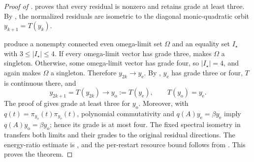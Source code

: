 \documentclass[11pt]{article}
\begin{document}
\begin{proof}[Proof of ]
 proves that every residual is nonzero and retains
grade at least three.  By
, the normalized
residuals are isometric to the diagonal monic-quadratic orbit
\(y_{k+1}=T(y_k)\).

 produce a nonempty connected even omega-limit set
\(\Omega\) and an equality set \(I_\star\) with
\(3\leq\lvert I_\star\rvert\leq4\).  If every omega-limit vector has grade
three,  makes \(\Omega\) a singleton.
Otherwise, some omega-limit vector has grade four, so
\(\lvert I_\star\rvert=4\), and
 again makes \(\Omega\) a singleton.
Therefore \(y_{2k}\to y_{\mathrm e}\).  By
, \(y_{\mathrm e}\) has grade three or four,
\(T\) is continuous there, and
\[
 y_{2k+1}=T(y_{2k})\longrightarrow
 y_{\mathrm o}:=T(y_{\mathrm e}),\qquad
 T(y_{\mathrm o})=y_{\mathrm e}.
\]
The proof of  gives grade at least three for
\(y_{\mathrm o}\).  Moreover, with
\(q(t)=\pi_{y_{\mathrm o}}(t)\pi_{y_{\mathrm e}}(t)\), polynomial
commutativity and \(q(A)y_{\mathrm e}=\beta y_{\mathrm e}\) imply
\(q(A)y_{\mathrm o}=\beta y_{\mathrm o}\); hence its grade is at most
four.  The fixed spectral isometry in 
transfers both limits and their grades to the original residual
directions.  The energy-ratio estimate is
, and the per-restart resource bound follows
from .  This proves the theorem.
\end{proof}



\end{document}

